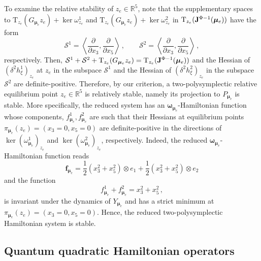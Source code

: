 \documentclass[11pt]{article}
\theoremstyle{plain}
\theoremstyle{definition}
\newcommand{\R}{\mathbb{R}}
\newcommand{\T}{\mathrm{T}}
\newcommand{\bomega}{{\boldsymbol{\omega}}}
\numberwithin{equation}{section}
\begin{document}
To examine the relative stability of $z_e\in\R^5$, note that
the supplementary spaces to $\T_{z_e}(G_{{\bm\mu}_e}z_e)+\ker\omega^1_{z_e}$ and $\T_{z_e}(G_{{\bm\mu}_e}z_e)+\ker\omega^2_{z_e}$ in $\T_{z_e}({\bf J}^{\Phi-1}(\bm\mu_e))$ have the form
$$
\mathcal{S}^1=\left\langle\frac{\partial}{\partial x_3},\frac{\partial}{\partial x_5} \right\rangle\,,\qquad \mathcal{S}^2=\left\langle\frac{\partial}{\partial x_3},\frac{\partial}{\partial x_5}\right\rangle\,,
$$
respectively. Then, $\mathcal{S}^1+\mathcal{S}^2+\T_{z_e}(G_{\bm\mu_e}z_e)=\T_{z_e}({\bf J}^{\Phi-1}(\bm\mu_e))$ and the Hessian of $(\delta^2h^1_\xi)_{z_e}$ at $z_e$ in the subspace $\mathcal{S}^1$ and the Hessian of $(\delta^2h^2_\xi)_{z_e}$ in the subspace $\mathcal{S}^2$ are definite-positive. 
Therefore, by our criterion, a two-polysymplectic relative equilibrium point $z_e\in\R^5$ is relatively stable, namely its projection to $P_{\bm\mu_e}$ is stable. More specifically, the reduced system has an $\bomega_{\bm\mu_e}$-Hamiltonian function whose components, $f^1_{\bm\mu_e},f^2_{\bm\mu_e}$ are such that their Hessians at equilibrium points $\pi_{\bm\mu_e}(z_e)=(x_3=0,x_5=0)$ are definite-positive in the directions of $\ker(\omega^1_{\bm \mu_e})_{z_e}$  and  $\ker(\omega^2_{\bm \mu_e})_{z_e}$, respectively. Indeed, the reduced $\bomega_{\bm\mu_e}$-Hamiltonian function reads
$$
\bm f_{\bm\mu_e}=\frac{1}2(x_3^2+x_5^2)\otimes e_1+\frac{1}2(x_3^2+x_5^2)\otimes e_2
$$
and the function
$$
f_{\bm\mu_e}^1+f_{\bm\mu_e}^2=x_3^2+x_5^2\,,
$$
is invariant under the dynamics of $Y_{\bm\mu_e}$ and has a strict minimum at $\pi_{\bm\mu_e}(z_e)=(x_3=0,x_5=0)$. Hence, the reduced two-polysymplectic Hamiltonian system is stable. 



\subsection{Quantum quadratic Hamiltonian operators}
\end{document}
